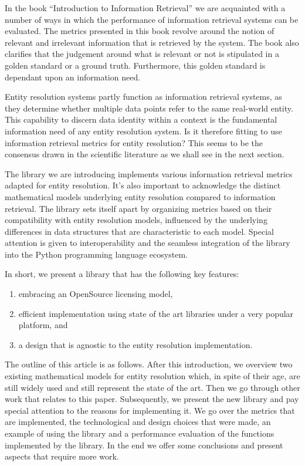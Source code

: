 \documentclass[a4paper,twoside]{article}
\begin{document}
    In the book ``Introduction to Information Retrieval'' we are acquainted with
    a number of ways in which the performance of information retrieval systems
    can be evaluated\cite{manning2008}.
    The metrics presented in this book revolve around the notion of relevant and
    irrelevant information that is retrieved by the system.
    The book also clarifies that the judgement around what is relevant or not is
    stipulated in a golden standard or a ground truth.
    Furthermore, this golden standard is dependant upon an information need.

    Entity resolution systems partly function as information retrieval systems,
    as they determine whether multiple data points refer to the same real-world
    entity.
    This capability to discern data identity within a context is the fundamental
    information need of any entity resolution system.
    Is it therefore fitting to use information retrieval metrics for entity
    resolution?
    This seems to be the consensus drawn in the scientific literature as we
    shall see in the next section.

    The library we are introducing implements various information retrieval
    metrics adapted for entity resolution.
    It's also important to acknowledge the distinct mathematical models
    underlying entity resolution compared to information retrieval.
    The library sets itself apart by organizing metrics based on their
    compatibility with entity resolution models, influenced by the underlying
    differences in data structures that are characteristic to each model.
    Special attention is given to interoperability and the seamless integration
    of the library into the Python programming language ecosystem.

    In short, we present a library that has the following key features:

    \begin{enumerate}
        \item embracing an OpenSource licensing model,
        \item efficient implementation using state of the art libraries under
        a very popular platform, and
        \item a design that is agnostic to the entity resolution implementation.
    \end{enumerate} 

    The outline of this article is as follows.
    After this introduction, we overview two existing mathematical models for
    entity resolution which, in spite of their age, are still widely used and
    still represent the state of the art.
    Then we go through other work that relates to this paper.
    Subsequently, we present the new library and pay special attention to the
    reasons for implementing it.
    We go over the metrics that are implemented, the technological and design
    choices that were made, an example of using the library and a performance
    evaluation of the functions implemented by the library.
    In the end we offer some conclusions and present aspects that require more
    work.
\end{document}
